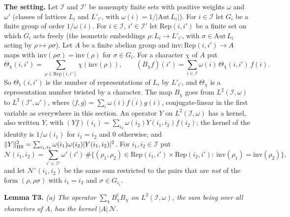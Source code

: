 \documentclass[11pt,letterpaper]{article}
\begin{document}
\textbf{The setting.} Let $\mathcal I$ and $\mathcal I'$ be nonempty finite sets with positive weights $\omega$ and
$\omega'$ (classes of lattices $L_i$ and $L'_{i'}$, with $\omega(i)=1/|\mathrm{Aut}\,L_i|$). For $i\in\mathcal I$
let $G_i$ be a finite group of order $1/\omega(i)$. For $i\in\mathcal I$, $i'\in\mathcal I'$ let
$\mathrm{Rep}(i,i')$ be a finite set on which $G_i$ acts freely (the isometric
embeddings $\rho:L_i\to L'_{i'}$, with $\sigma\in\mathrm{Aut}\,L_i$ acting by $\rho\mapsto\rho\sigma$). Let $A$ be a
finite abelian group and $\mathrm{inv}:\mathrm{Rep}(i,i')\to A$ maps with
$\mathrm{inv}(\rho\sigma)=\mathrm{inv}(\rho)$ for $\sigma\in G_i$. For a character $\chi$ of $A$ put
\begin{equation}\label{tr:theta}
 \Theta_\chi(i,i')=\sum_{\rho\in\mathrm{Rep}(i,i')}\chi(\mathrm{inv}(\rho)),\qquad
 (B_\chi f)(i')=\sum_{i\in\mathcal I}\omega(i)\,\Theta_\chi(i,i')\,f(i).
\end{equation}
So $\Theta_1(i,i')$ is the number of representations of $L_i$ by $L'_{i'}$, and $\Theta_\chi$ is a
representation number twisted by a character. The map $B_\chi$ goes from $L^2(\mathcal I,\omega)$ to
$L^2(\mathcal I',\omega')$, where $\langle f,g\rangle=\sum_i\omega(i)\overline{f(i)}g(i)$, conjugate-linear in the first variable as
everywhere in this section. An operator $Y$ on
$L^2(\mathcal I,\omega)$ has a kernel, also written $Y$, with
$(Yf)(i_1)=\sum_{i_2}\omega(i_2)Y(i_1,i_2)f(i_2)$; the kernel of the identity is $1/\omega(i_1)$ for $i_1=i_2$
and $0$ otherwise, and
$\|Y\|_{\rm HS}^2=\sum_{i_1,i_2}\omega(i_1)\omega(i_2)|Y(i_1,i_2)|^2$. For $i_1,i_2\in\mathcal I$ put
\begin{equation}\label{tr:N}
 \mathcal N(i_1,i_2)=\sum_{i'\in\mathcal I'}\omega'(i')\,\#\big\{(\rho_1,\rho_2)\in\mathrm{Rep}(i_1,i')\times\mathrm{Rep}(i_2,i'):\ \mathrm{inv}(\rho_1)=\mathrm{inv}(\rho_2)\big\},
\end{equation}
and let $\mathcal N^{\circ}(i_1,i_2)$ be the same sum restricted to the pairs that are \emph{not} of the form
$(\rho,\rho\sigma)$ with $i_1=i_2$ and $\sigma\in G_{i_1}$.

\textbf{Lemma T3.} \emph{\textup{(a)} The operator $\sum_\chi B_\chi^\dagger B_\chi$ on $L^2(\mathcal I,\omega)$, the
sum being over all characters of $A$, has the kernel $|A|\,\mathcal N$.}
\end{document}
